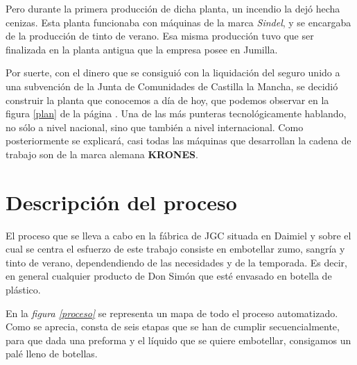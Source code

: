 \documentclass[11pt,a4paper,spanish,twoside]{report}
\begin{document}

Pero durante la primera producción de dicha planta, un incendio la dejó hecha
cenizas. Esta planta funcionaba con máquinas de la marca \emph{Sindel}, y se 
encargaba de la producción de tinto de verano. Esa misma producción tuvo que
ser finalizada en la planta antigua que la empresa posee en Jumilla.

Por suerte, con el dinero que se consiguió con la liquidación del seguro unido
a una subvención de la Junta de Comunidades de Castilla la Mancha, se decidió
construir la planta que conocemos a día de hoy, que podemos observar en la 
figura \ref{plan} de la página \pageref{plan}. Una de las más punteras
tecnológicamente hablando, no sólo a nivel nacional, sino que también a nivel
internacional. Como posteriormente se explicará, casi todas las máquinas que
desarrollan la cadena de trabajo son de la marca alemana \textbf{KRONES}.


\chapter{Descripción del proceso}
El proceso que se lleva a cabo en la fábrica de JGC situada en Daimiel y
sobre el cual se centra el esfuerzo de este trabajo consiste en embotellar
zumo, sangría y tinto de verano, dependendiendo de las necesidades y de la
temporada. Es decir, en general cualquier producto de Don Simón que esté 
envasado en botella de plástico.

En la \emph{figura \ref{proceso}} se representa un mapa de todo el proceso
automatizado. Como se aprecia, consta de seis etapas que se han de cumplir
secuencialmente, para que dada una preforma y el líquido que se quiere
embotellar, consigamos un palé lleno de botellas.
\end{document}
